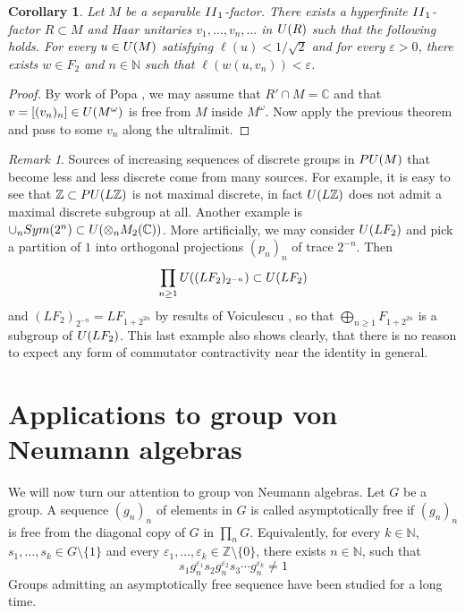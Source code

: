 \documentclass[11pt]{amsproc}
\theoremstyle{plain}
\newtheorem{corollary}[theorem]{Corollary}
\theoremstyle{remark}
\newtheorem{remark}[theorem]{Remark}
\begin{document}
\begin{corollary}
Let $M$ be a separable ${\rm II}_1$-factor. There exists a hyperfinite ${\rm II}_1$-factor $R \subset M$ and Haar unitaries $v_1,\dots,v_n,\dots$ in ${\rm U}(R)$ such that the following holds. For every $u \in {\rm U}(M)$ satisfying $\ell(u)< 1/\sqrt{2}$ and for every $\varepsilon>0$, there exists $w \in F_2$ and $n \in \mathbb N$ such that $\ell(w(u,v_n))< \varepsilon$.
\end{corollary}
\begin{proof}
By work of Popa \cite{MR1372533}, we may assume that $R' \cap M= \mathbb C$ and that $v = [(v_n)_n] \in {\rm U}(M^{\omega})$ is free from $M$ inside $M^{\omega}$. Now apply the previous theorem and pass to some $v_n$ along the ultralimit. \end{proof}

\begin{remark}
Sources of increasing sequences of discrete groups in ${\rm PU}(M)$ that become less and less discrete come from many sources. For example, it is easy to see that $\mathbb Z \subset {\rm PU}(L\mathbb Z)$ is not maximal discrete, in fact ${\rm U}(L\mathbb Z)$ does not admit a maximal discrete subgroup at all. Another example is $\cup_n {\rm Sym}(2^n) \subset {\rm U}(\otimes_n M_2(\mathbb C))$. More artificially, we may consider ${\rm U}(LF_2)$ and pick a partition of $1$ into orthogonal projections $(p_n)_n$ of trace $2^{-n}$. Then
$$\prod_{n\geq 1} {\rm U}((LF_2)_{2^{-n}}) \subset {\rm U}(LF_2)$$
and $(LF_2)_{2^{-n}} = LF_{1 + 2^{2n}}$ by results of Voiculescu \cite{MR1217253}, so that $\bigoplus_{n \geq 1} F_{1+2^{2n}}$ is a subgroup of ${\rm U}(LF_2)$. This last example also shows clearly, that there is no reason to expect any form of commutator contractivity near the identity in general.

\end{remark}

\section{Applications to group von Neumann algebras}

We will now turn our attention to group von Neumann algebras. Let $G$ be a group.  A sequence $(g_n)_n$ of elements in $G$ is called asymptotically free if $(g_n)_n$ is free from the diagonal copy of $G$ in $\prod_n G$. Equivalently, for every $k \in \mathbb N$, $s_1,\dots,s_k \in G \setminus \{1\}$ and every $\varepsilon_1,\dots,\varepsilon_k \in \mathbb Z \setminus \{0\}$, there exists $n \in \mathbb N$, such that
\[
s_1 g_n^{\varepsilon_1} s_2 g_n^{\varepsilon_2} s_3 \cdots g_n^{\varepsilon_k} \neq 1
\]
Groups admitting an asymptotically free sequence have been studied for a long time.
\end{document}
